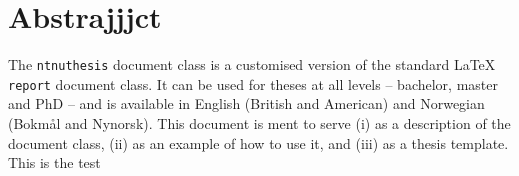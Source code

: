 \chapter*{Abstrajjjct}

The \texttt{ntnuthesis} document class is a customised version of the standard \LaTeX{} \texttt{report} document class. It can be used for theses at all levels – bachelor, master and PhD – and is available in English (British and American) and Norwegian (Bokmål and Nynorsk). This document is ment to serve (i) as a description of the document class, (ii) as an example of how to use it, and (iii) as a thesis template.
This is the test
